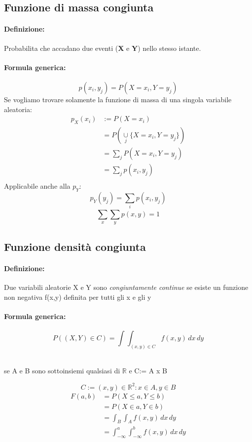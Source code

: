 \documentclass[]{article}
\newcommand{\definizione}{\paragraph{Definizione:}}
\newcommand{\formula}{\paragraph{Formula generica:}}
\begin{document}
    \subsection{Funzione di massa congiunta}
    \definizione Probabilita che accadano due eventi (\textbf{X} e \textbf{Y}) nello stesso istante.
    \formula \[ p(x_i, y_j) = P(X=x_i, Y=y_j) \]
    Se vogliamo trovare solamente la funzione di massa di una singola variabile aleatoria:
    \begin{equation*}
        \begin{split}
            p_X(x_i) & := P(X = x_i) \\ 
            & = P(\underset{j}{\cup} \{ X=x_i, Y=y_j \}) \\
            & = \sum_{j}^{} P(X=x_i, Y=y_j) \\ 
            & = \sum_{j}^{} p(x_i, y_j) \\
        \end{split}
    \end{equation*}
    Applicabile anche alla $p_Y$:
    \[ p_Y(y_j) = \sum_{i}^{} p(x_i, y_j) \]
    \linebreak[4]
    \[ \sum_{x}^{} \sum_{y}^{} p(x, y) = 1 \]

    \newpage
    \subsection{Funzione densità congiunta}
    \definizione Due variabili aleatorie X e Y sono \textit{congiuntamente continue} se esiste un funzione non negativa f(x,y)
    definita per tutti gli x e gli y
    \formula
    \[ P((X,Y) \in C) = \int_{}^{} \int_{(x,y) \in C}^{} f(x,y) \, dx \, dy \] \\
    \centerline{se A e B sono sottoinsiemi qualsiasi di $\mathbb{R}$ e C:= A x B}
    \[ C:= {(x,y) \in \mathbb{R}^2 : x \in A, y \in B}\]
    \begin{equation*}
        \begin{split}
            F(a,b) & = P(X \leq a, Y \leq b) \\
            & = P(X \in a, Y \in b) \\
            & = \int_{B}^{} \int_{A}^{} f(x,y) \, dx \, dy \\
            & = \int_{-\infty}^{a} \int_{-\infty}^{b} f(x,y) \, dx \, dy \\
        \end{split}
    \end{equation*}
\end{document}
